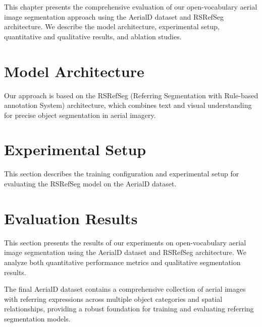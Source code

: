 \cleardoublepage
\label{chap:evaluation}

This chapter presents the comprehensive evaluation of our open-vocabulary aerial image segmentation approach using the AerialD dataset and RSRefSeg architecture. We describe the model architecture, experimental setup, quantitative and qualitative results, and ablation studies.

\section{Model Architecture}

Our approach is based on the RSRefSeg (Referring Segmentation with Rule-based annotation System) architecture, which combines text and visual understanding for precise object segmentation in aerial imagery.

\section{Experimental Setup}

This section describes the training configuration and experimental setup for evaluating the RSRefSeg model on the AerialD dataset.


\section{Evaluation Results}

This section presents the results of our experiments on open-vocabulary aerial image segmentation using the AerialD dataset and RSRefSeg architecture. We analyze both quantitative performance metrics and qualitative segmentation results.

The final AerialD dataset contains a comprehensive collection of aerial images with referring expressions across multiple object categories and spatial relationships, providing a robust foundation for training and evaluating referring segmentation models.

